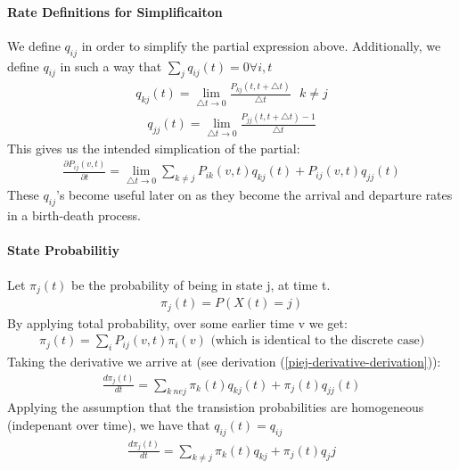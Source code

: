 \paragraph{Rate Definitions for Simplificaiton} We define $q_{ij}$ in order to
simplify the partial expression above. Additionally, we define $q_{ij}$ in such
a way that $\sum_j q_{ij}(t) = 0  \forall i,t$
\begin{equation*} \begin{split}
	q_{kj}(t) = \lim_{\triangle t \to 0} \frac{P_{kj}(t,t+\triangle t)}{\triangle
	t} \mbox{ } k \ne j
\end{split} \end{equation*}
\begin{equation*} \begin{split}
	q_{jj}(t) = \lim_{\triangle t \to 0} \frac{P_{jj}(t,t+\triangle t)-1}{\triangle t}
\end{split} \end{equation*}
This gives us the intended simplication of the partial:
\begin{equation*} \begin{split}
	\frac{\partial P_{ij}(v,t)}{\partial t}
	= \lim_{\triangle t \to 0}
	\sum_{k \ne j} P_{ik}(v,t) q_{kj}(t)
	+ P_{ij}(v,t)q_{jj}(t)
\end{split} \end{equation*}
These $q_{ij}$'s become useful later on as they become the arrival and departure
rates in a birth-death process.


\paragraph{State Probabilitiy} \label{piej-derivative-derivation-context}
Let $\pi_j(t)$ be the probability of being in
state j, at time t.
\begin{equation*} \begin{split}
	\pi_j(t) = P(X(t) = j)
\end{split} \end{equation*}
By applying total probability, over some earlier time v we get:
\begin{equation*} \begin{split}
	\pi_j(t) = \sum_{i} P_{ij}(v,t) \pi_i(v) \mbox{ (which is identical to the discrete case)}
\end{split} \end{equation*}
Taking the derivative we arrive at (see derivation (\ref{piej-derivative-derivation})):
\begin{equation*} \begin{split}
	\frac{d \pi_j(t) }{dt} = \sum_{k\ ne j} \pi_k(t)q_{kj}(t) + \pi_j(t)q_{jj}(t)
\end{split} \end{equation*}
Applying the assumption that the transistion probabilities are homogeneous
(indepenant over time), we have that $q_{ij}(t) = q_{ij}$
\begin{equation*} \begin{split}
	\frac{d \pi_j(t) }{dt} = \sum_{k \ne j} \pi_k(t)q_{kj} + \pi_j(t)q_jj
\end{split} \end{equation*}

